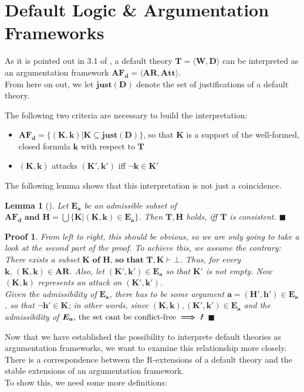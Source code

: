 \documentclass[12pt]{report}
\numberwithin{figure}{chapter}
\theoremstyle{break}
\newtheorem{lem}{Lemma}[chapter]
\newtheorem*{prf}{Proof}
\newenvironment{mylem}{\begin{lem}}{$\blacksquare$ \end{lem}}
\newenvironment{myprf}{\begin{prf}}{$\blacksquare$ \end{prf}}
\begin{document}
\section{Default Logic \& Argumentation Frameworks}
As it is pointed out in 3.1 of \cite{Dung}, a default theory $\bm{T = \langle W,D \rangle}$ can be interpreted as an argumentation framework $\bm{AF_{d} = \langle AR,Att \rangle}$.\\
From here on out, we let $\bm{just(D)}$ denote the set of justifications of a default theory.

The following two criteria are necessary to build the interpretation:
\begin{itemize}
	\item{$\bm{AF_{d} = \{(K,k) \vert K \subseteq just(D)\}}$, so that $\bm{K}$ is a support of the well-formed, closed formula $\bm{k}$ with respect to $\bm{T}$}
	\item{$\bm{(K,k)}$ attacks $\bm{(K',k')}$ iff $\bm{\lnot k \in K'}$}
\end{itemize}

The following lemma shows that this interpretation is not just a coincidence.

\begin{mylem}[\cite{Dung}]
Let $\bm{E_{a}}$ be an admissible subset of $\bm{AF_{d} \text{ and } H = \bigcup \{K \vert (K,k) \in E_{a}\}}$.
Then $\bm{T,H}$ holds, iff $\bm{T}$ is consistent.
\end{mylem}

\begin{myprf}
From left to right, this should be obvious, so we are only going to take a look at the second part of the proof.
To achieve this, we assume the contrary:\\There exists a subset $\bm{K \text{ of } H \text{, so that } T,K \vdash \bot}$.
Thus, for every $\bm{k \text{, }(K,k) \in AR}$. Also, let $\bm{(K',k') \in E_{a}}$ so that $\bm{K'}$ is not empty.
Now $\bm{(K,k)}$ represents an attack on $\bm{(K',k')}$.\\Given the admissibility of $\bm{E_{a}}$, there has to be some argument $\bm{a = (H',h') \in E_{a}}$, so that
$\bm{\lnot h' \in K}$; in other words, since $\bm{(K,k),(K',k') \in E_{a}}$ and the admissibility of $\bm{E_{a} \text{, the set cant be conflict-free} \implies \text{\Lightning}}$ 
\end{myprf}

\newpage

Now that we have established the possibility to interprete default theories as argumentation frameworks, we want to examine this relationship more closely.
There is a correspondence between the R-extensions of a default theory and the stable extensions of an argumentation framework.\\
To show this, we need some more definitions:
\end{document}

